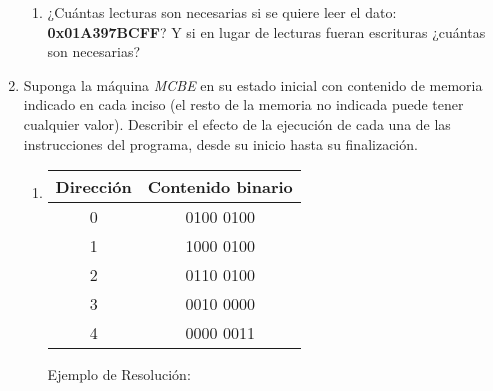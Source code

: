 \documentclass[12pt]{article}
\begin{document}
\begin{enumerate}
\begin{enumerate}
            \item ¿Cuántas lecturas son necesarias si se quiere leer el dato:
                \textbf{0x01A397BCFF}? Y si en lugar de lecturas fueran
                escrituras ¿cuántas son necesarias?

        \end{enumerate}

    \item Suponga la máquina \emph{MCBE} en su estado inicial con contenido de
        memoria indicado en cada inciso (el resto de la memoria no indicada
        puede tener cualquier valor).  Describir el efecto de la ejecución de
        cada una de las instrucciones del programa, desde su inicio hasta su
        finalización.

        \begin{enumerate}

            \item \begin{tabular}{| c | c |}
                    \hline
                    \textbf{Dirección}&\textbf{Contenido binario}\\
                    \hline \hline
                    0 & 0100 0100\\
                    \hline
                    1 & 1000 0100\\
                    \hline
                    2 & 0110 0100\\
                    \hline
                    3 & 0010 0000\\
                    \hline
                    4 & 0000 0011\\
                    \hline
            \end{tabular}

            Ejemplo de Resolución:
                

\end{enumerate}
\end{enumerate}
\end{document}
